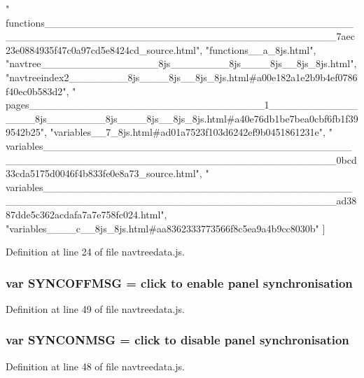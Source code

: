 \begin{DoxyCode}
\textcolor{stringliteral}{"
      functions\_\_\_\_\_\_\_\_\_\_\_\_\_\_\_\_\_\_\_\_\_\_\_\_\_\_\_\_\_\_\_\_\_\_\_\_\_\_\_\_\_\_\_\_\_\_\_\_\_\_\_\_\_\_\_\_\_\_\_\_\_\_\_\_\_\_\_\_\_\_\_\_\_\_\_\_\_\_\_\_\_\_\_\_\_\_\_7aec23e0884935f47c0a97cd5e8424cd\_source.html"},
\textcolor{stringliteral}{"functions\_\_a\_8js.html"},
\textcolor{stringliteral}{"navtree\_\_\_\_\_\_\_\_\_\_\_\_\_\_\_\_8js\_\_\_\_\_\_\_\_8js\_\_\_\_8js\_\_8js\_8js.html"},
\textcolor{stringliteral}{"navtreeindex2\_\_\_\_\_\_\_\_8js\_\_\_\_8js\_\_8js\_8js.html#a00e182a1e2b9b4ef0786f40ec0b583d2"},
\textcolor{stringliteral}{"
      pages\_\_\_\_\_\_\_\_\_\_\_\_\_\_\_\_\_\_\_\_\_\_\_\_\_\_\_\_\_\_\_\_1\_\_\_\_\_\_\_\_\_\_\_\_\_\_\_\_8js\_\_\_\_\_\_\_\_8js\_\_\_\_8js\_\_8js\_8js.html#a40e76db1be7bea0cbf6fb1f399542b25"},
\textcolor{stringliteral}{"variables\_\_7\_8js.html#ad01a7523f103d6242ef9b0451861231e"},
\textcolor{stringliteral}{"
      variables\_\_\_\_\_\_\_\_\_\_\_\_\_\_\_\_\_\_\_\_\_\_\_\_\_\_\_\_\_\_\_\_\_\_\_\_\_\_\_\_\_\_\_\_\_\_\_\_\_\_\_\_\_\_\_\_\_\_\_\_\_\_\_\_\_\_\_\_\_\_\_\_\_\_\_\_\_\_\_\_\_\_\_\_\_\_\_0bcd33cda5175d0046f4b833fe0e8a73\_source.html"},
\textcolor{stringliteral}{"
      variables\_\_\_\_\_\_\_\_\_\_\_\_\_\_\_\_\_\_\_\_\_\_\_\_\_\_\_\_\_\_\_\_\_\_\_\_\_\_\_\_\_\_\_\_\_\_\_\_\_\_\_\_\_\_\_\_\_\_\_\_\_\_\_\_\_\_\_\_\_\_\_\_\_\_\_\_\_\_\_\_\_\_\_\_\_\_\_ad3887dde5c362acdafa7a7e758fc024.html"},
\textcolor{stringliteral}{"variables\_\_\_\_c\_\_8js\_8js.html#aa8362333773566f8c5ea9a4b9cc8030b"}
]
\end{DoxyCode}


Definition at line 24 of file navtreedata.\+js.

\subsubsection[{S\+Y\+N\+C\+O\+F\+F\+M\+S\+G}]{\setlength{\rightskip}{0pt plus 5cm}var S\+Y\+N\+C\+O\+F\+F\+M\+S\+G = \textquotesingle{}click to enable panel synchronisation\textquotesingle{}}\label{navtreedata_8js_a8b93d8f469f8aeb3a0c17b922a2d32ed}


Definition at line 49 of file navtreedata.\+js.

\subsubsection[{S\+Y\+N\+C\+O\+N\+M\+S\+G}]{\setlength{\rightskip}{0pt plus 5cm}var S\+Y\+N\+C\+O\+N\+M\+S\+G = \textquotesingle{}click to disable panel synchronisation\textquotesingle{}}\label{navtreedata_8js_ab31fdb4752a1ada1b708d49d7482f948}


Definition at line 48 of file navtreedata.\+js.

